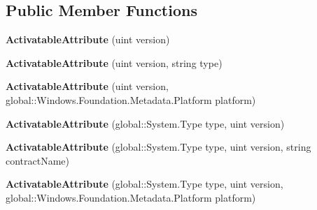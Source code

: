 \subsection*{Public Member Functions}
\begin{DoxyCompactItemize}
\item 
\mbox{\label{class_windows_1_1_foundation_1_1_metadata_1_1_activatable_attribute_acdb0cd22e6352e90c6da8ee2c53564ce}} 
{\bfseries Activatable\+Attribute} (uint version)
\item 
\mbox{\label{class_windows_1_1_foundation_1_1_metadata_1_1_activatable_attribute_a74a27250c3f2d52a6ab6bc53f78594df}} 
{\bfseries Activatable\+Attribute} (uint version, string type)
\item 
\mbox{\label{class_windows_1_1_foundation_1_1_metadata_1_1_activatable_attribute_a94c9a8436dde14583be0384f58dde314}} 
{\bfseries Activatable\+Attribute} (uint version, global\+::\+Windows.\+Foundation.\+Metadata.\+Platform platform)
\item 
\mbox{\label{class_windows_1_1_foundation_1_1_metadata_1_1_activatable_attribute_a0c631c7846b8e88aacfc234b13f25fa3}} 
{\bfseries Activatable\+Attribute} (global\+::\+System.\+Type type, uint version)
\item 
\mbox{\label{class_windows_1_1_foundation_1_1_metadata_1_1_activatable_attribute_a765085efebfd0bcd0be210e056f09933}} 
{\bfseries Activatable\+Attribute} (global\+::\+System.\+Type type, uint version, string contract\+Name)
\item 
\mbox{\label{class_windows_1_1_foundation_1_1_metadata_1_1_activatable_attribute_a406f07b4e02527c717e7403d999d4443}} 
{\bfseries Activatable\+Attribute} (global\+::\+System.\+Type type, uint version, global\+::\+Windows.\+Foundation.\+Metadata.\+Platform platform)
\item 
\mbox{\label{class_windows_1_1_foundation_1_1_metadata_1_1_activatable_attribute_acdb0cd22e6352e90c6da8ee2c53564ce}} 

\end{DoxyCompactItemize}
